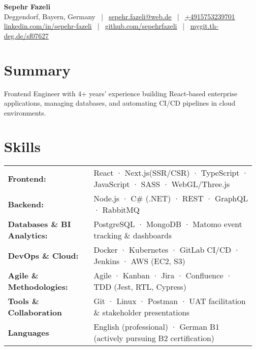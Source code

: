 \documentclass[a4paper,10pt]{article}
\newcommand{\uhref}[2]{\href{#1}{\underline{#2}}}
\begin{document}
\begin{center}
    {\LARGE \textbf{Sepehr Fazeli}}\\[0.95em]
    \faMapMarker{} Deggendorf, Bayern, Germany \, | \, 
    \faEnvelope\enspace\uhref{mailto:sepehr.fazeli@web.de}{sepehr.fazeli@web.de} \, | \, \faMobile\enspace\uhref{tel:+4915753239701}{+4915753239701}\\[0.25em]
    \faLinkedin\enspace\uhref{https://linkedin.com/in/sepehr-fazeli}{linkedin.com/in/sepehr-fazeli} \, | \, \faGithub\enspace\uhref{https://github.com/sepehrfazeli}{github.com/sepehrfazeli} \, | \, \faGitlab\enspace\uhref{https://mygit.th-deg.de/sf07627}{mygit.th-deg.de/sf07627}
\end{center}
\vspace{-2em}


\newcommand{\summaryline}{-1.9em} 
\section*{Summary}
\vspace{-0.8em}
\hline
\vspace{0.2em}
Frontend Engineer with 4+ years’ experience building React-based enterprise applications, managing databases, and automating CI/CD pipelines in cloud environments. 
\vspace{-1.5em}

\newcommand{\skillspacing}{0.1em}
\section*{Skills}
\vspace{-0.8em}
\hline
\vspace{0.2em}
\begin{tabularx}{0.2\linewidth}{ l l }
\textbf{Frontend:} & React · Next.js(SSR/CSR) · TypeScript · JavaScript · SASS · WebGL/Three.js \\[\skillspacing]
\textbf{Backend:} & Node.js · C\# (.NET) · REST · GraphQL · RabbitMQ \\[\skillspacing]
\textbf{Databases \& BI Analytics:} & PostgreSQL · MongoDB · Matomo event tracking \& dashboards \\[\skillspacing]
\textbf{DevOps \& Cloud:} & Docker · Kubernetes · GitLab CI/CD · Jenkins · AWS (EC2, S3) \\[\skillspacing]
\textbf{Agile \& Methodologies:} & Agile · Kanban · Jira · Confluence · TDD (Jest, RTL, Cypress) \\[\skillspacing]
\textbf{Tools \& Collaboration} & Git · Linux · Postman · UAT facilitation \& stakeholder presentations\\[0.5em]
\textbf{Languages} & English (professional) · German B1 (actively pursuing B2 certification)
\end{tabularx}
\vspace{-1em}
\end{document}
